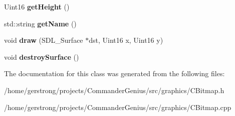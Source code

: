 \begin{DoxyCompactItemize}
\item 
\hypertarget{class_c_bitmap_a6065c7ea2d7851b1deb26cb0aa94d691}{
Uint16 {\bfseries getHeight} ()}
\label{class_c_bitmap_a6065c7ea2d7851b1deb26cb0aa94d691}

\item 
\hypertarget{class_c_bitmap_af08a933b557ec44319fd0185dfdf6475}{
std::string {\bfseries getName} ()}
\label{class_c_bitmap_af08a933b557ec44319fd0185dfdf6475}

\item 
\hypertarget{class_c_bitmap_a6a3edf4640c2d32048edf0048859ccb7}{
void {\bfseries draw} (SDL\_\-Surface $\ast$dst, Uint16 x, Uint16 y)}
\label{class_c_bitmap_a6a3edf4640c2d32048edf0048859ccb7}

\item 
\hypertarget{class_c_bitmap_adebba078c641ac53615bd03652cde736}{
void {\bfseries destroySurface} ()}
\label{class_c_bitmap_adebba078c641ac53615bd03652cde736}

\end{DoxyCompactItemize}


The documentation for this class was generated from the following files:\begin{DoxyCompactItemize}
\item 
/home/gerstrong/projects/CommanderGenius/src/graphics/CBitmap.h\item 
/home/gerstrong/projects/CommanderGenius/src/graphics/CBitmap.cpp\end{DoxyCompactItemize}
